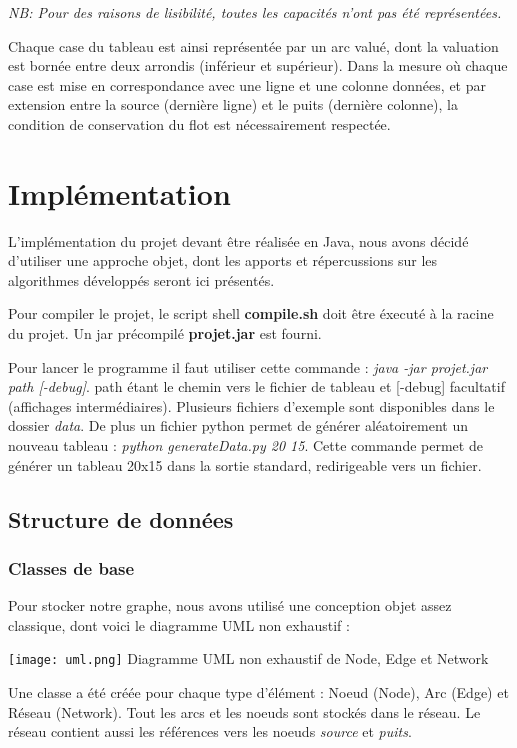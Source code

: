 \documentclass[letterpaper,12pt]{article}
\begin{document}
\textit{NB: Pour des raisons de lisibilité, toutes les capacités n'ont pas été représentées.}
\hfill \break

Chaque case du tableau est ainsi représentée par un arc valué, dont la valuation est bornée entre deux arrondis (inférieur et supérieur). Dans la mesure où chaque case est mise en correspondance avec une ligne et une colonne données, et par extension entre la source (dernière ligne) et le puits (dernière colonne), la condition de conservation du flot est nécessairement respectée.

\section{Implémentation}
L'implémentation du projet devant être réalisée en Java, nous avons décidé d'utiliser une approche objet, dont les apports et répercussions sur les algorithmes développés seront ici présentés.

Pour compiler le projet, le script shell \textbf{compile.sh} doit être éxecuté à la racine du projet. Un jar précompilé \textbf{projet.jar} est fourni. 

Pour lancer le programme il faut utiliser cette commande : \textit{java -jar projet.jar path [-debug]}. path étant le chemin vers le fichier de tableau et [-debug] facultatif (affichages intermédiaires). Plusieurs fichiers d'exemple sont disponibles dans le dossier \textit{data}. De plus un fichier python permet de générer aléatoirement un nouveau tableau : \textit{python generateData.py 20 15}. Cette commande permet de générer un tableau 20x15 dans la sortie standard, redirigeable vers un fichier.

\subsection{Structure de données}
\subsubsection{Classes de base}
Pour stocker notre graphe, nous avons utilisé une conception objet assez classique, dont voici le diagramme UML non exhaustif :
\begin{center}
    \texttt{[image: uml.png]}
    Diagramme UML non exhaustif de Node, Edge et Network
\end{center}
\hfill \break
Une classe a été créée pour chaque type d'élément : Noeud (Node), Arc (Edge) et Réseau (Network). Tout les arcs et les noeuds sont stockés dans le réseau. Le réseau contient aussi les références vers les noeuds \textit{source} et \textit{puits}.
\end{document}

